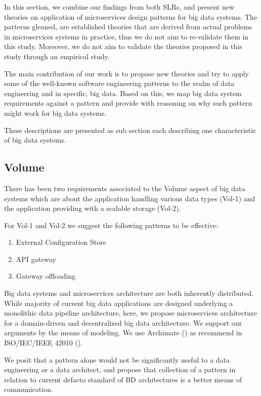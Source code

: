 \documentclass[conference]{IEEEtran}
\begin{document}
In this section, we combine our findings from both SLRs, and present new theories on application of microservices design patterns for big data systems. The patterns gleaned, are established theories that are derived from actual problems in microservices systems in practice, thus we do not aim to re-validate them in this study. Moreover, we do not aim to validate the theories proposed in this study through an empirical study.

The main contribution of our work is to propose new theories and try to apply some of the well-known software engineering patterns to the realm of data engineering and in specific, big data. Based on this, we map big data system requirements against a pattern and provide with reasoning on why such pattern might work for big data systems. 

These descriptions are presented as sub section each describing one characteristic of big data systems. 


\subsection{Volume}

There has been two requirements associated to the Volume aspect of big data systems which are about the application handling various data types (Vol-1) and the application providing with a scalable storage (Vol-2). 

For Vol-1 and Vol-2 we suggest the following patterns to be effective: 

\begin{enumerate}
    \item External Configuration Store
    \item API gateway 
    \item Gateway offloading 
\end{enumerate}

Big data systems and microservices architecture are both inherently distributed. While majority of current big data applications are designed underlying a monolithic data pipeline architecture, here, we propose microservices architecture for a domain-driven and decentralized big data architecture. We support our arguments by the means of modeling. We use Archimate (\cite{lankhorst2013language}) as recommend in ISO/IEC/IEEE 42010 (\cite{Chaabane}). 

We posit that a pattern alone would not be significantly useful to a data engineering or a data architect, and propose that collection of a pattern in relation to current defacto standard of BD architectures is a better means of communication. 
\end{document}
